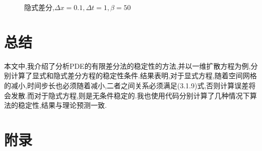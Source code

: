 \documentclass{article}
\numberwithin{equation}{subsection}
\begin{document}
\begin{figure}[H]
\centering
{}
\quad
{}
\quad
{}
\quad
{}
\caption{隐式差分,$\Delta x = 0.1,\Delta t = 1,\beta = 50$}
\end{figure}

\section{总结}
本文中,我介绍了分析PDE的有限差分法的稳定性的方法,并以一维扩散方程为例,分别计算了显式和隐式差分方程的稳定性条件.结果表明,对于显式方程,随着空间网格的减小,时间步长也必须随着减小,二者之间关系必须满足(3.1.9)式,否则计算误差将会发散.而对于隐式方程,则是无条件稳定的.我也使用代码分别计算了几种情况下算法的稳定性,结果与理论预测一致.
\clearpage
\section{附录}


\clearpage
\small{


}
\end{document}
